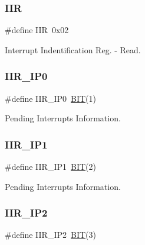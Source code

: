 \subsubsection{\texorpdfstring{I\+IR}{IIR}}
{\footnotesize\ttfamily \#define I\+IR~0x02}



Interrupt Indentification Reg. -\/ Read. 

\hypertarget{group___serial_ga404030d0e2acaec8bd39b8a9b01daf83}{}\label{group___serial_ga404030d0e2acaec8bd39b8a9b01daf83} 
\subsubsection{\texorpdfstring{I\+I\+R\+\_\+\+I\+P0}{IIR\_IP0}}
{\footnotesize\ttfamily \#define I\+I\+R\+\_\+\+I\+P0~\hyperlink{group___serial_ga3a8ea58898cb58fc96013383d39f482c}{B\+IT}(1)}



Pending Interrupts Information. 

\hypertarget{group___serial_ga25fc1de85f4df9dc8249e52bdc25f73d}{}\label{group___serial_ga25fc1de85f4df9dc8249e52bdc25f73d} 
\subsubsection{\texorpdfstring{I\+I\+R\+\_\+\+I\+P1}{IIR\_IP1}}
{\footnotesize\ttfamily \#define I\+I\+R\+\_\+\+I\+P1~\hyperlink{group___serial_ga3a8ea58898cb58fc96013383d39f482c}{B\+IT}(2)}



Pending Interrupts Information. 

\hypertarget{group___serial_ga62a27224c8cece6052419d605737fd1e}{}\label{group___serial_ga62a27224c8cece6052419d605737fd1e} 
\subsubsection{\texorpdfstring{I\+I\+R\+\_\+\+I\+P2}{IIR\_IP2}}
{\footnotesize\ttfamily \#define I\+I\+R\+\_\+\+I\+P2~\hyperlink{group___serial_ga3a8ea58898cb58fc96013383d39f482c}{B\+IT}(3)}



